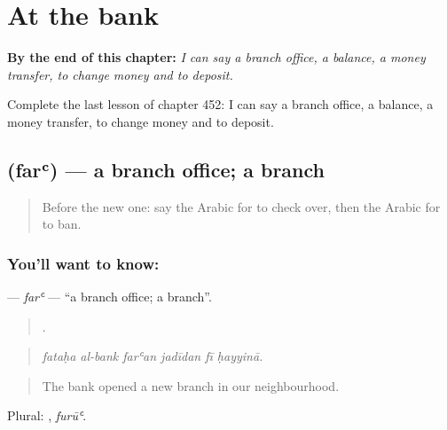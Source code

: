 
\chapter{At the bank}
\label{ch:ar-at-the-bank}

\begin{chapteropening}
\textbf{By the end of this chapter:} \emph{I can say a branch office, a balance, a money transfer, to change money and to deposit.}

Complete the last lesson of chapter 452: I can say a branch office, a balance, a money transfer, to change money and to deposit.
\end{chapteropening}

\section[\texorpdfstring{\ar{فرع} (farʿ)}{فرع (farʿ)}]{ (farʿ) — a branch office; a branch}

\label{lesson:AR-C452-far}



\begin{quote}
Before the new one: say the Arabic for to check over, then the Arabic for to ban.
\end{quote}

\subsection*{You'll want to know: }
\textbf{} — \emph{farʿ} — \textquotedblleft{}a branch office; a branch\textquotedblright{}.

\begin{quote}
     .
\end{quote}

\begin{quote}
\emph{fataḥa al-bank farʿan jadīdan fī ḥayyinā.}
\end{quote}

\begin{quote}
The bank opened a new branch in our neighbourhood.
\end{quote}

Plural: , \emph{furūʿ}.

